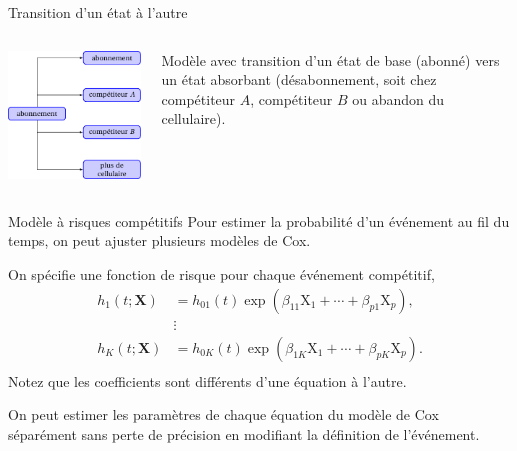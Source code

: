 \documentclass[
  ignorenonframetext,
]{beamer}
\begin{document}
\begin{frame}{Transition d'un état à l'autre}
\protect\hypertarget{transition-dun-uxe9tat-uxe0-lautre}{}
\begin{columns}[T]
\begin{column}{0.6\textwidth}
\includegraphics{figures/transition_etats_modele_risque_competitifs.pdf}
\end{column}

\begin{column}{0.4\textwidth}
Modèle avec transition d'un état de base (abonné) vers un état absorbant
(désabonnement, soit chez compétiteur \(A\), compétiteur \(B\) ou
abandon du cellulaire).
\end{column}
\end{columns}
\end{frame}

\begin{frame}{Modèle à risques compétitifs}
\protect\hypertarget{moduxe8le-uxe0-risques-compuxe9titifs-1}{}
Pour estimer la probabilité d'un événement au fil du temps, on peut
ajuster plusieurs modèles de Cox.

On spécifie une fonction de risque pour chaque événement compétitif,
\begin{align*}
h_1(t; \mathbf{X})&= h_{01}(t) \exp(\beta_{11}\mathrm{X}_1 + \cdots + \beta_{p1} \mathrm{X}_p),\\
&\vdots\\
h_K(t; \mathbf{X})&= h_{0K}(t) \exp(\beta_{1K}\mathrm{X}_1 + \cdots + \beta_{pK} \mathrm{X}_p).\\
\end{align*} Notez que les coefficients sont différents d'une équation à
l'autre.

On peut estimer les paramètres de chaque équation du modèle de Cox
séparément sans perte de précision en modifiant la définition de
l'événement.
\end{frame}
\end{document}
